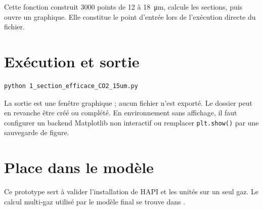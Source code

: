 \documentclass[11pt,a4paper]{article}
\begin{document}
Cette fonction construit 3000 points de 12 à \SI{18}{\micro\metre}, calcule
les sections, puis ouvre un graphique. Elle constitue le point d'entrée lors
de l'exécution directe du fichier.

\section{Exécution et sortie}

\begin{lstlisting}[language=bash]
python 1_section_efficace_CO2_15um.py
\end{lstlisting}

La sortie est une fenêtre graphique ; aucun fichier n'est exporté. Le dossier
 peut en revanche être créé ou complété. En environnement
sans affichage, il faut configurer un backend Matplotlib non interactif ou
remplacer \texttt{plt.show()} par une sauvegarde de figure.

\section{Place dans le modèle}

Ce prototype sert à valider l'installation de HAPI et les unités sur un seul
gaz. Le calcul multi-gaz utilisé par le modèle final se trouve dans
.
\end{document}
